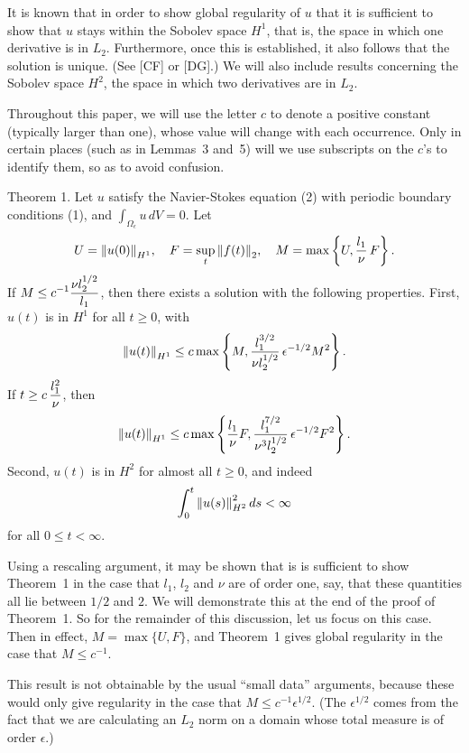 It is known that in order to show global regularity of
$u$ that it is sufficient to show that $u$ stays within
the Sobolev space $H^1$, that is, the space in which one
derivative is in $L_2$.  Furthermore, once this is
established, it also follows that the solution is unique.
(See [CF] or [DG].)  We will also include 
results concerning the Sobolev space $H^2$, the space in which
two derivatives are in $L_2$.

Throughout this paper, we
will use the letter $c$ to denote a positive constant (typically
larger than one), whose value will change with each occurrence.
Only in certain places (such as in Lemmas~3 and~5) will we 
use subscripts on the $c$'s to identify them, so as to avoid confusion.

\def\middlethmone{Let 
$$ U = \normo{u(0)}_{H^1}, \quad
   F = \sup_t \normo{f(t)}_2, \quad
   M = \max\left\{U,{l_1\over\nu}\,F\right\} .$$}

\def\endthmone{there exists a solution with the following
properties.  First, $u(t)$ is
in $H^1$ for all $t\ge 0$, with
$$ \normo{u(t)}_{H^1} \le c 
   \max\left\{M,
   {l_1^{3/2} \over \nu l_2^{1/2}} \, \epsilon^{-1/2} M^2\right\}. $$
If $\displaystyle t \ge c \, {l_1^2 \over \nu}$, then
$$ \normo{u(t)}_{H^1} \le 
   c 
   \max\left\{{l_1 \over \nu} F,
   {l_1^{7/2} \over \nu^3 l_2^{1/2} } \, \epsilon^{-1/2} F^2 \right\}. $$
Second, $u(t)$ is in $H^2$ for almost all $t \ge 0$, and indeed
$$ \int_0^t \normo{u(s)}_{H^2}^2 \, ds < \infty $$
for all $0\le t < \infty$.
}

\proclaim Theorem 1.  Let
$u$ satisfy the Navier-Stokes equation (2) with periodic
boundary conditions (1), and $\int_{\Omega_\epsilon} u \, dV = 0$.
\middlethmone
If $\displaystyle M \le c^{-1} {\nu l_2^{1/2} \over l_1}$, then 
\endthmone

Using a rescaling argument,
it may be shown that is is sufficient to show Theorem~1 in the case
that $l_1$, $l_2$ and $\nu$ are of order one, say, 
that these quantities all lie between $1/2$ and $2$.  We will demonstrate
this at the end of the proof of Theorem~1.  So for the remainder of this 
discussion, let us focus on this case.  Then in effect, $M = \max\{U,F\}$, 
and Theorem~1 gives global regularity in the case that $M \le c^{-1}$.

This result is not obtainable by the usual ``small data'' arguments, because
these would only give regularity in the case that $M \le c^{-1} \epsilon^{1/2}$.
(The $\epsilon^{1/2}$ comes from the fact that we are calculating
an $L_2$ norm on a domain whose total measure is of order $\epsilon$.)

